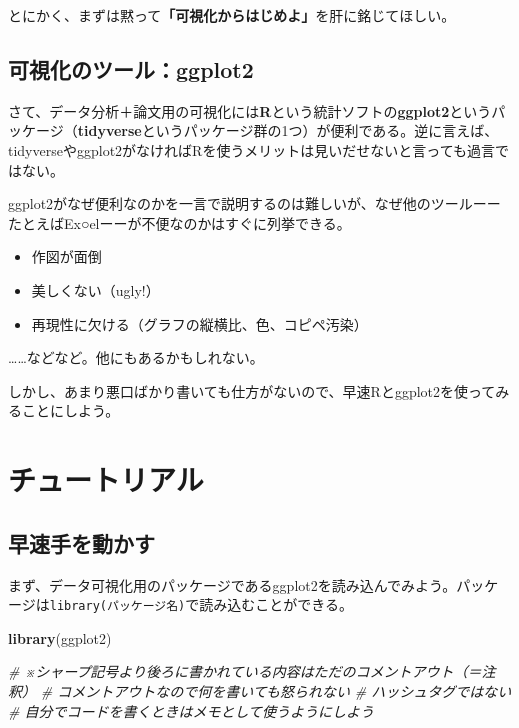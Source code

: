 \documentclass[]{book}
\newenvironment{Shaded}{\begin{snugshade}}{\end{snugshade}}
\newcommand{\KeywordTok}[1]{\textcolor[rgb]{0.13,0.29,0.53}{\textbf{#1}}}
\newcommand{\CommentTok}[1]{\textcolor[rgb]{0.56,0.35,0.01}{\textit{#1}}}
\newcommand{\NormalTok}[1]{#1}
\begin{document}
とにかく、まずは黙って\textbf{「可視化からはじめよ」}を肝に銘じてほしい。

\section{可視化のツール：ggplot2}\label{ggplot2}

さて、データ分析＋論文用の可視化には\textbf{R}という統計ソフトの\textbf{ggplot2}というパッケージ（\textbf{tidyverse}というパッケージ群の1つ）が便利である。逆に言えば、tidyverseやggplot2がなければRを使うメリットは見いだせないと言っても過言ではない。

ggplot2がなぜ便利なのかを一言で説明するのは難しいが、なぜ他のツールーーたとえばEx○elーーが不便なのかはすぐに列挙できる。

\begin{itemize}
\item
  作図が面倒
\item
  美しくない（ugly!）
\item
  再現性に欠ける（グラフの縦横比、色、コピペ汚染）
\end{itemize}

\ldots{}\ldots{}などなど。他にもあるかもしれない。

しかし、あまり悪口ばかり書いても仕方がないので、早速Rとggplot2を使ってみることにしよう。

\chapter{チュートリアル}\label{tutorial}

\section{早速手を動かす}

まず、データ可視化用のパッケージであるggplot2を読み込んでみよう。パッケージは\texttt{library(パッケージ名)}で読み込むことができる。

\begin{Shaded}
\begin{Highlighting}[]
\KeywordTok{library}\NormalTok{(ggplot2)}

\CommentTok{# ※シャープ記号より後ろに書かれている内容はただのコメントアウト（＝注釈）}
\CommentTok{# コメントアウトなので何を書いても怒られない}
\CommentTok{# ハッシュタグではない}
\CommentTok{# 自分でコードを書くときはメモとして使うようにしよう}
\end{Highlighting}
\end{Shaded}
\end{document}
